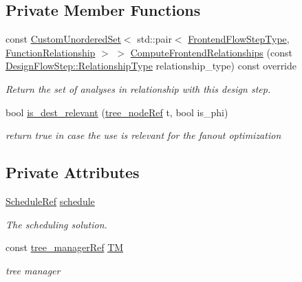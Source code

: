 \subsection*{Private Member Functions}
\begin{DoxyCompactItemize}
\item 
const \hyperlink{classCustomUnorderedSet}{Custom\+Unordered\+Set}$<$ std\+::pair$<$ \hyperlink{frontend__flow__step_8hpp_afeb3716c693d2b2e4ed3e6d04c3b63bb}{Frontend\+Flow\+Step\+Type}, \hyperlink{classFrontendFlowStep_af7cf30f2023e5b99e637dc2058289ab0}{Function\+Relationship} $>$ $>$ \hyperlink{classfanout__opt_aa781d3ef037625b718dbc83764bc940f}{Compute\+Frontend\+Relationships} (const \hyperlink{classDesignFlowStep_a723a3baf19ff2ceb77bc13e099d0b1b7}{Design\+Flow\+Step\+::\+Relationship\+Type} relationship\+\_\+type) const override
\begin{DoxyCompactList}\small\item\em Return the set of analyses in relationship with this design step. \end{DoxyCompactList}\item 
bool \hyperlink{classfanout__opt_a37b7c68c5c7bd86b3e27508da2544643}{is\+\_\+dest\+\_\+relevant} (\hyperlink{tree__node_8hpp_a6ee377554d1c4871ad66a337eaa67fd5}{tree\+\_\+node\+Ref} t, bool is\+\_\+phi)
\begin{DoxyCompactList}\small\item\em return true in case the use is relevant for the fanout optimization \end{DoxyCompactList}\end{DoxyCompactItemize}
\subsection*{Private Attributes}
\begin{DoxyCompactItemize}
\item 
\hyperlink{schedule_8hpp_af67f402958b3b52a1ec5cc4ce08ae3b9}{Schedule\+Ref} \hyperlink{classfanout__opt_a33865012bc3aa6c23d83e553bc153cac}{schedule}
\begin{DoxyCompactList}\small\item\em The scheduling solution. \end{DoxyCompactList}\item 
const \hyperlink{tree__manager_8hpp_a96ff150c071ce11a9a7a1e40590f205e}{tree\+\_\+manager\+Ref} \hyperlink{classfanout__opt_a264ac8a1b00265c3bdae24a20fd319ba}{TM}
\begin{DoxyCompactList}\small\item\em tree manager \end{DoxyCompactList}\end{DoxyCompactItemize}
